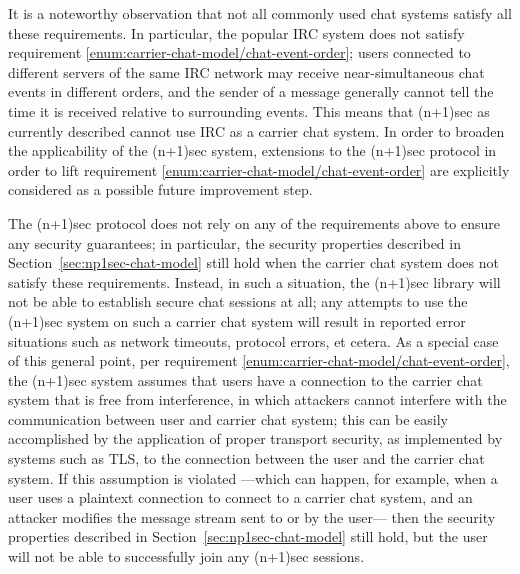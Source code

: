 \documentclass{article}
\begin{document}
It is a noteworthy observation that not all commonly used chat systems satisfy all these requirements.
In particular, the popular IRC system does not satisfy requirement \ref{enum:carrier-chat-model/chat-event-order}; users connected to different servers of the same IRC network may receive near-simultaneous chat events in different orders, and the sender of a message generally cannot tell the time it is received relative to surrounding events.
This means that (n+1)sec as currently described cannot use IRC as a carrier chat system.
In order to broaden the applicability of the (n+1)sec system, extensions to the (n+1)sec protocol in order to lift requirement \ref{enum:carrier-chat-model/chat-event-order} are explicitly considered as a possible future improvement step.

The (n+1)sec protocol does not rely on any of the requirements above to ensure any security guarantees; in particular, the security properties described in Section~\ref{sec:np1sec-chat-model} still hold when the carrier chat system does not satisfy these requirements.
Instead, in such a situation, the (n+1)sec library will not be able to establish secure chat sessions at all; any attempts to use the (n+1)sec system on such a carrier chat system will result in reported error situations such as network timeouts, protocol errors, et cetera.
As a special case of this general point, per requirement \ref{enum:carrier-chat-model/chat-event-order}, the (n+1)sec system assumes that users have a connection to the carrier chat system that is free from interference, in which attackers cannot interfere with the communication between user and carrier chat system; this can be easily accomplished by the application of proper transport security, as implemented by systems such as TLS, to the connection between the user and the carrier chat system.
If this assumption is violated ---which can happen, for example, when a user uses a plaintext connection to connect to a carrier chat system, and an attacker modifies the message stream sent to or by the user--- then the security properties described in Section~\ref{sec:np1sec-chat-model} still hold, but the user will not be able to successfully join any (n+1)sec sessions.
\end{document}
